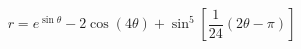 \documentclass[preview]{standalone}
\begin{document}
\begin{align*}
r = e^{\sin \theta} - 2 \cos(4\theta)+ \sin^5 \left[ \dfrac{1}{24}\left(2\theta-\pi\right) \right]
\end{align*}
\end{document}
